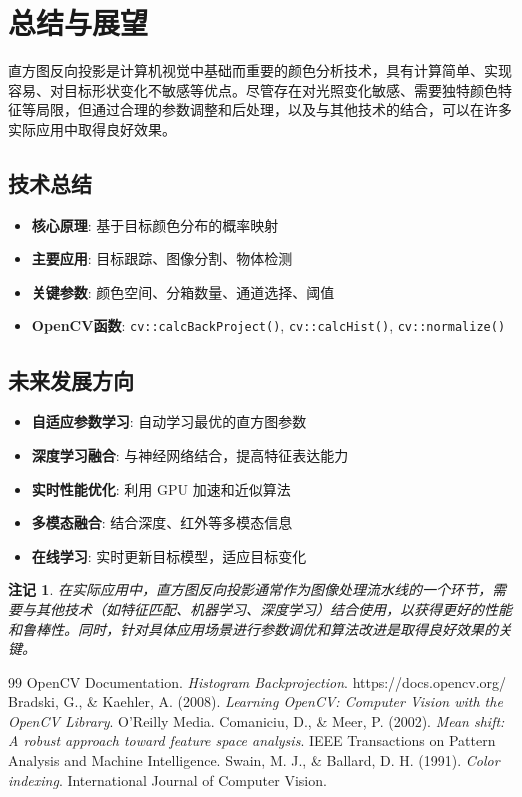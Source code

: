 \documentclass{article}
\newtheorem{remark}{注记}[section]
\begin{document}
\section{总结与展望}

直方图反向投影是计算机视觉中基础而重要的颜色分析技术，具有计算简单、实现容易、对目标形状变化不敏感等优点。尽管存在对光照变化敏感、需要独特颜色特征等局限，但通过合理的参数调整和后处理，以及与其他技术的结合，可以在许多实际应用中取得良好效果。

\subsection{技术总结}
\begin{itemize}
    \item \textbf{核心原理}: 基于目标颜色分布的概率映射
    \item \textbf{主要应用}: 目标跟踪、图像分割、物体检测
    \item \textbf{关键参数}: 颜色空间、分箱数量、通道选择、阈值
    \item \textbf{OpenCV函数}: \texttt{cv::calcBackProject()}, \texttt{cv::calcHist()}, \texttt{cv::normalize()}
\end{itemize}

\subsection{未来发展方向}
\begin{itemize}
    \item \textbf{自适应参数学习}: 自动学习最优的直方图参数
    \item \textbf{深度学习融合}: 与神经网络结合，提高特征表达能力
    \item \textbf{实时性能优化}: 利用 GPU 加速和近似算法
    \item \textbf{多模态融合}: 结合深度、红外等多模态信息
    \item \textbf{在线学习}: 实时更新目标模型，适应目标变化
\end{itemize}

\begin{remark}
在实际应用中，直方图反向投影通常作为图像处理流水线的一个环节，需要与其他技术（如特征匹配、机器学习、深度学习）结合使用，以获得更好的性能和鲁棒性。同时，针对具体应用场景进行参数调优和算法改进是取得良好效果的关键。
\end{remark}

\begin{thebibliography}{99}
 OpenCV Documentation. \emph{Histogram Backprojection}. https://docs.opencv.org/
 Bradski, G., \& Kaehler, A. (2008). \emph{Learning OpenCV: Computer Vision with the OpenCV Library}. O'Reilly Media.
 Comaniciu, D., \& Meer, P. (2002). \emph{Mean shift: A robust approach toward feature space analysis}. IEEE Transactions on Pattern Analysis and Machine Intelligence.
 Swain, M. J., \& Ballard, D. H. (1991). \emph{Color indexing}. International Journal of Computer Vision.
\end{thebibliography}
\end{document}
